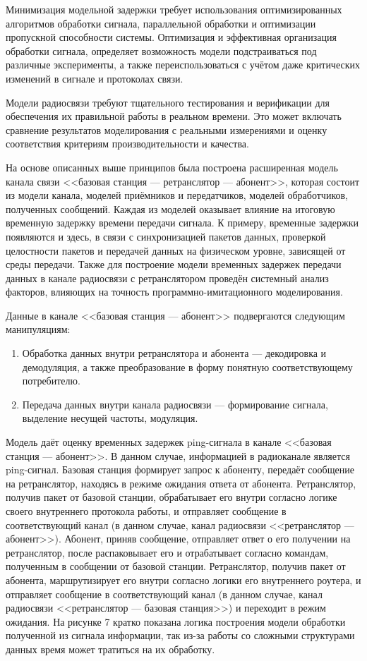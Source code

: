 \begin{onehalfspace}
Минимизация модельной задержки требует использования оптимизированных алгоритмов обработки сигнала, параллельной обработки и оптимизации пропускной способности системы. Оптимизация и эффективная организация обработки сигнала, определяет возможность модели подстраиваться под различные эксперименты, а также переиспользоваться с учётом даже критических изменений в сигнале и протоколах связи.


Модели радиосвязи требуют тщательного тестирования и верификации для обеспечения их правильной работы в реальном времени. Это может включать сравнение результатов моделирования с реальными измерениями и оценку соответствия критериям производительности и качества. 


На основе описанных выше принципов была построена расширенная модель канала связи <<базовая станция — ретранслятор — абонент>>, которая состоит из модели канала, моделей приёмников и передатчиков, моделей обработчиков, полученных сообщений. Каждая из моделей оказывает влияние на итоговую временную задержку времени передачи сигнала. К примеру, временные задержки появляются и здесь, в связи с синхронизацией пакетов данных, проверкой целостности пакетов и передачей данных на физическом уровне, зависящей от среды передачи. Также для построение модели временных задержек передачи данных в канале радиосвязи с ретранслятором проведён системный анализ факторов, влияющих на точность программно-имитационного моделирования. 


Данные в канале <<базовая станция — абонент>> подвергаются следующим манипуляциям:

	\begin{enumerate} 
		\item Обработка данных внутри ретранслятора и абонента — декодировка и демодуляция, а также преобразование в форму понятную соответствующему потребителю.
	    \item Передача данных внутри канала радиосвязи — формирование сигнала, выделение несущей частоты, модуляция.
	\end{enumerate} 
 
Модель даёт оценку временных задержек ping-сигнала в канале <<базовая станция — абонент>>. В данном случае, информацией в радиоканале является ping-сигнал. Базовая станция формирует запрос к абоненту, передаёт сообщение на ретранслятор, находясь в режиме ожидания ответа от абонента. Ретранслятор, получив пакет от базовой станции, обрабатывает его внутри согласно логике своего внутреннего протокола работы, и отправляет сообщение в соответствующий канал (в данном случае, канал радиосвязи <<ретранслятор — абонент>>). Абонент, приняв сообщение, отправляет ответ о его получении на ретранслятор, после распаковывает его и отрабатывает согласно командам, полученным в сообщении от базовой станции. Ретранслятор, получив пакет от абонента, маршрутизирует его внутри согласно логики его внутреннего роутера, и отправляет сообщение в соответствующий канал (в данном случае, канал радиосвязи <<ретранслятор — базовая станция>>) и переходит в режим ожидания. На рисунке 7 кратко показана логика построения модели обработки полученной из сигнала информации, так из-за работы со сложными структурами данных время может тратиться на их обработку.



\end{onehalfspace}
